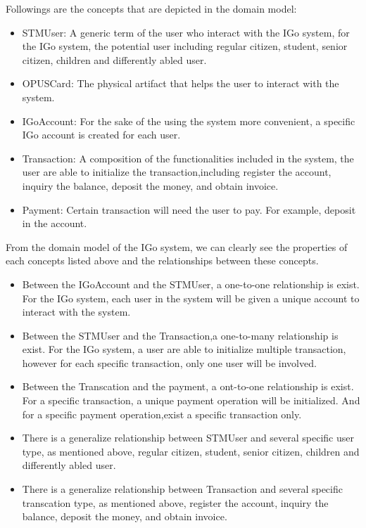 \documentclass[11pt, english]{report}
\begin{document}
Followings are the concepts that are depicted in the domain model:\\
\begin{itemize}
  \item STMUser: A generic term of the user who interact with the IGo system, for the IGo system, the potential user including regular citizen, student, senior citizen, children and differently abled user.
  \item OPUSCard: The physical artifact that helps the user to interact with the system.
  \item IGoAccount: For the sake of the using the system more convenient, a specific IGo account is created for each user.
  \item Transaction: A composition of the functionalities included in the system, the user are able to initialize the transaction,including register the account, inquiry the balance, deposit the money, and obtain invoice.
  \item Payment: Certain transaction will need the user to pay. For example, deposit in the account.
\end{itemize}
\bigskip
From the domain model of the IGo system, we can clearly see the properties of each concepts listed above and the relationships between these concepts.
\begin{itemize}
\item Between the IGoAccount and the STMUser, a one-to-one relationship is exist. For the IGo system, each user in the system will be given a unique account to interact with the system.
\item Between the STMUser and the Transaction,a one-to-many relationship is exist. For the IGo system, a user are able to initialize multiple transaction, however for each specific transaction, only one user will be involved.
\item Between the Transcation and the payment, a ont-to-one relationship is exist. For a specific transaction, a unique payment operation will be initialized. And for a specific payment operation,exist a specific transaction only.
\item There is a generalize relationship between STMUser and several specific user type, as mentioned above, regular citizen, student, senior citizen, children and differently abled user.

\item There is a generalize relationship between  Transaction and several specific transcation type, as mentioned above,  register the account, inquiry the balance, deposit the money, and obtain invoice.

\end{itemize}
\end{document}
